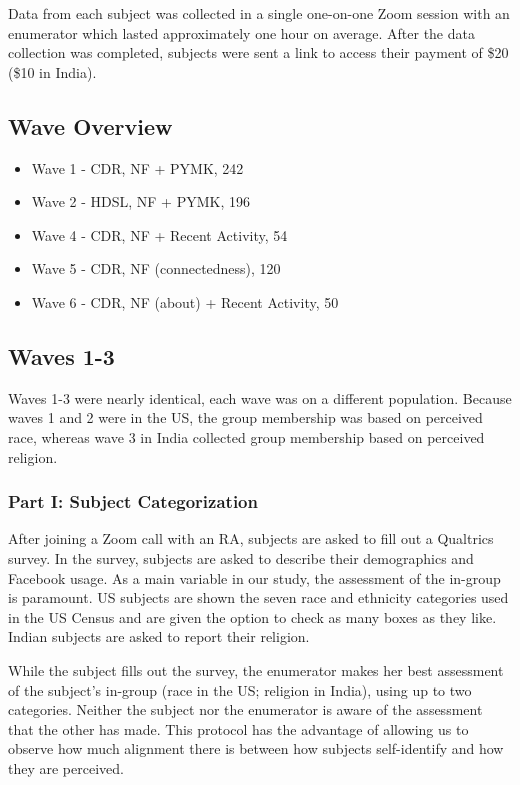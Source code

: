\documentclass[12pt,letterpaper]{article}
\begin{document}
Data from each subject was collected in a single one-on-one Zoom session with an enumerator which lasted approximately one hour on average. After the data collection was completed, subjects were sent a link to access their payment of \$20 (\$10 in India).

\subsection{Wave Overview}
\begin{itemize}
    \item Wave 1 - CDR, NF + PYMK, 242
    \item Wave 2 - HDSL, NF + PYMK, 196
    \item Wave 4 - CDR, NF + Recent Activity, 54
    \item Wave 5 - CDR, NF (connectedness), 120
    \item Wave 6 - CDR, NF (about) + Recent Activity, 50
\end{itemize}

\subsection{Waves 1-3}

Waves 1-3 were nearly identical, each wave was on a different population. Because waves 1 and 2 were in the US, the group membership was based on perceived race, whereas wave 3 in India collected group membership based on perceived religion.

\subsubsection{Part I: Subject Categorization} After joining a Zoom call with an RA, subjects are asked to fill out a Qualtrics survey. In the survey, subjects are asked to describe their demographics and Facebook usage. As a main variable in our study, the assessment of the in-group is paramount. US subjects are shown the seven race and ethnicity categories used in the US Census and are given the option to check as many boxes as they like. Indian subjects are asked to report their religion.

While the subject fills out the survey, the enumerator makes her best assessment of the subject’s in-group (race in the US; religion in India), using up to two categories. Neither the subject nor the enumerator is aware of the assessment that the other has made. This protocol has the advantage of allowing us to observe how much alignment there is between how subjects self-identify and how they are perceived.
\end{document}
